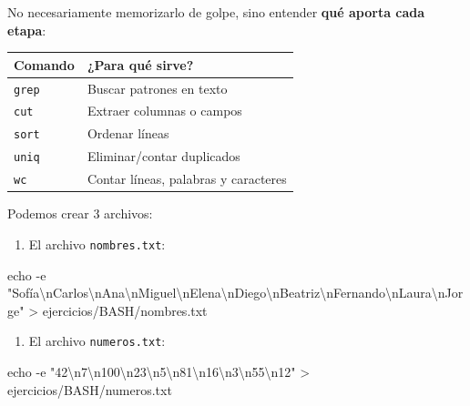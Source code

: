 \documentclass[
  spanish,
  12pt,
  letterpaper,
  DIV=11,
  numbers=noendperiod]{scrreprt}
\newenvironment{Shaded}{\begin{snugshade}}{\end{snugshade}}
\newcommand{\AttributeTok}[1]{\textcolor[rgb]{0.40,0.45,0.13}{#1}}
\newcommand{\BuiltInTok}[1]{\textcolor[rgb]{0.00,0.23,0.31}{#1}}
\newcommand{\NormalTok}[1]{\textcolor[rgb]{0.00,0.23,0.31}{#1}}
\newcommand{\OperatorTok}[1]{\textcolor[rgb]{0.37,0.37,0.37}{#1}}
\newcommand{\StringTok}[1]{\textcolor[rgb]{0.13,0.47,0.30}{#1}}
\newcounter{none} %
\providecommand{\tightlist}{%
  \setlength{\itemsep}{0pt}\setlength{\parskip}{0pt}}
\begin{document}
No necesariamente memorizarlo de golpe, sino entender \textbf{qué aporta
cada etapa}:

{\def\LTcaptype{none} %
\begin{longtable}[]{@{}ll@{}}
\toprule\noalign{}
Comando & ¿Para qué sirve? \\
\midrule\noalign{}
\endhead
\bottomrule\noalign{}
\endlastfoot
\texttt{grep} & Buscar patrones en texto \\
\texttt{cut} & Extraer columnas o campos \\
\texttt{sort} & Ordenar líneas \\
\texttt{uniq} & Eliminar/contar duplicados \\
\texttt{wc} & Contar líneas, palabras y caracteres \\
\end{longtable}
}

Podemos crear 3 archivos:

\begin{enumerate}
\def\labelenumi{\arabic{enumi}.}
\tightlist
\item
  El archivo \texttt{nombres.txt}:
\end{enumerate}

\begin{Shaded}
\begin{Highlighting}[]
\BuiltInTok{echo} \AttributeTok{{-}e} \StringTok{"Sofía\textbackslash{}nCarlos\textbackslash{}nAna\textbackslash{}nMiguel\textbackslash{}nElena\textbackslash{}nDiego\textbackslash{}nBeatriz\textbackslash{}nFernando\textbackslash{}nLaura\textbackslash{}nJorge"} \OperatorTok{\textgreater{}}\NormalTok{ ejercicios/BASH/nombres.txt}
\end{Highlighting}
\end{Shaded}

\begin{enumerate}
\def\labelenumi{\arabic{enumi}.}
\setcounter{enumi}{1}
\tightlist
\item
  El archivo \texttt{numeros.txt}:
\end{enumerate}

\begin{Shaded}
\begin{Highlighting}[]
\BuiltInTok{echo} \AttributeTok{{-}e} \StringTok{"42\textbackslash{}n7\textbackslash{}n100\textbackslash{}n23\textbackslash{}n5\textbackslash{}n81\textbackslash{}n16\textbackslash{}n3\textbackslash{}n55\textbackslash{}n12"} \OperatorTok{\textgreater{}}\NormalTok{ ejercicios/BASH/numeros.txt}
\end{Highlighting}
\end{Shaded}
\end{document}
